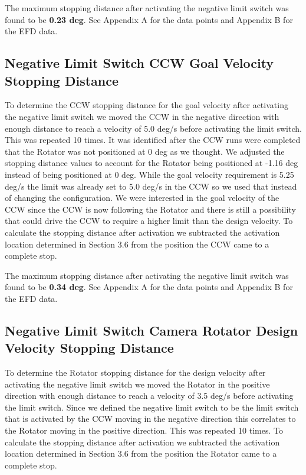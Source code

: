 \documentclass[SE,lsstdraft,authoryear,toc]{lsstdoc}
\begin{document}
The maximum stopping distance after activating the negative limit switch
was found to be \textbf{0.23 deg}. See Appendix A for the data points
and Appendix B for the EFD data.

\hypertarget{negative-limit-switch-ccw-goal-velocity-stopping-distance}{%
\subsection{Negative Limit Switch CCW Goal Velocity Stopping
Distance}\label{negative-limit-switch-ccw-goal-velocity-stopping-distance}}

To determine the CCW stopping distance for the goal velocity after
activating the negative limit switch we moved the CCW in the negative
direction with enough distance to reach a velocity of 5.0 deg/s before
activating the limit switch. This was repeated 10 times. It was
identified after the CCW runs were completed that the Rotator was not
positioned at 0 deg as we thought. We adjusted the stopping distance
values to account for the Rotator being positioned at -1.16 deg instead
of being positioned at 0 deg. While the goal velocity requirement is
5.25 deg/s the limit was already set to 5.0 deg/s in the CCW so we used
that instead of changing the configuration. We were interested in the
goal velocity of the CCW since the CCW is now following the Rotator and
there is still a possibility that could drive the CCW to require a
higher limit than the design velocity. To calculate the stopping
distance after activation we subtracted the activation location
determined in Section 3.6 from the position the CCW came to a complete
stop.

The maximum stopping distance after activating the negative limit switch
was found to be \textbf{0.34 deg}. See Appendix A for the data points
and Appendix B for the EFD data.

\hypertarget{negative-limit-switch-camera-rotator-design-velocity-stopping-distance}{%
\subsection{\texorpdfstring{Negative Limit Switch Camera Rotator Design
Velocity Stopping Distance
}{Negative Limit Switch Camera Rotator Design Velocity Stopping Distance }}\label{negative-limit-switch-camera-rotator-design-velocity-stopping-distance}}

To determine the Rotator stopping distance for the design velocity after
activating the negative limit switch we moved the Rotator in the
positive direction with enough distance to reach a velocity of 3.5 deg/s
before activating the limit switch. Since we defined the negative limit
switch to be the limit switch that is activated by the CCW moving in the
negative direction this correlates to the Rotator moving in the positive
direction. This was repeated 10 times. To calculate the stopping
distance after activation we subtracted the activation location
determined in Section 3.6 from the position the Rotator came to a
complete stop.
\end{document}
